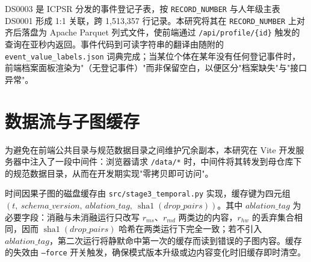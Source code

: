 DS0003 是 ICPSR 分发的事件登记子表，按 \texttt{RECORD\_NUMBER} 与人年级主表 DS0001 形成 1:1 关联，跨 1{,}513{,}357 行记录。本研究将其在 \texttt{RECORD\_NUMBER} 上对齐后落盘为 Apache Parquet 列式文件，使前端通过 \texttt{/api/profile/\{id\}} 触发的查询在亚秒内返回。事件代码到可读字符串的翻译由随附的 \texttt{event\_value\_labels.json} 词典完成；当某位个体在某年没有任何登记事件时，前端档案面板渲染为"（无登记事件）"而非保留空白，以便区分"档案缺失"与"接口异常"。

\section{数据流与子图缓存}\label{sec:impl-cache}

为避免在前端公共目录与规范数据目录之间维护冗余副本，本研究在 Vite 开发服务器中注入了一段中间件：浏览器请求 \texttt{/data/*} 时，中间件将其转发到母仓库下的规范数据目录，从而在开发期实现"零拷贝即可访问"。

时间因果子图的磁盘缓存由 \texttt{src/stage3\_temporal.py} 实现，缓存键为四元组 \((t,\ \mathit{schema\_version},\ \mathit{ablation\_tag},\ \operatorname{sha1}(\mathit{drop\_pairs}))\)。其中 \(\mathit{ablation\_tag}\) 为必要字段：消融与未消融运行只改写 \(r_{ms}\)、\(r_{md}\) 两类边的内容，\(r_{hw}\) 的丢弃集合相同，因而 \(\operatorname{sha1}(\mathit{drop\_pairs})\) 哈希在两类运行下完全一致；若不引入 \(\mathit{ablation\_tag}\)，第二次运行将静默命中第一次的缓存而读到错误的子图内容。缓存的失效由 \texttt{--force} 开关触发，确保模式版本升级或边内容变化时旧缓存即时清空。
